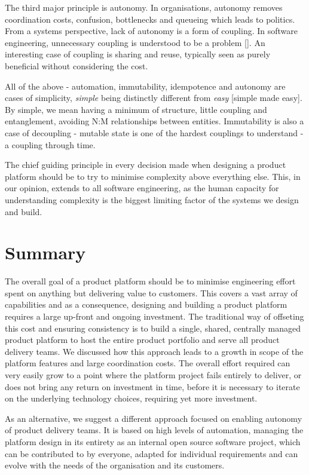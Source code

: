 \documentclass[reprint,amsmath,amssymb,aps]{revtex4-1}
\begin{document}
The third major principle is autonomy. In organisations, autonomy removes coordination costs, confusion, bottlenecks and queueing which leads to politics. From a systems perspective, lack of autonomy is a form of coupling. In software engineering, unnecessary coupling is understood to be a problem []. An interesting case of coupling is sharing and reuse, typically seen as purely beneficial without considering the cost.

All of the above - automation, immutability, idempotence and autonomy are cases of simplicity, \textit{simple} being distinctly different from \textit{easy} [simple made easy]. By simple, we mean having a minimum of structure, little coupling and entanglement, avoiding N:M relationships between entities. Immutability is also a case of decoupling - mutable state is one of the hardest couplings to understand - a coupling through time.

The chief guiding principle in every decision made when designing a product platform should be to try to minimise complexity above everything else. This, in our opinion, extends to all software engineering, as the human capacity for understanding complexity is the biggest limiting factor of the systems we design and build.

\section*{\label{sec:summary}Summary}

The overall goal of a product platform should be to minimise engineering effort spent on anything but delivering value to customers. This covers a vast array of capabilities and as a consequence, designing and building a product platform requires a large up-front and ongoing investment. The traditional way of offseting this cost and ensuring consistency is to build a single, shared, centrally managed product platform to host the entire product portfolio and serve all product delivery teams. We discussed how this approach leads to a growth in scope of the platform features and large coordination costs. The overall effort required can very easily grow to a point where the platform project fails entirely to deliver, or does not bring any return on investment in time, before it is necessary to iterate on the underlying technology choices, requiring yet more investment.

As an alternative, we suggest a different approach focused on enabling autonomy of product delivery teams. It is based on high levels of automation, managing the platform design in its entirety as an internal open source software project, which can be contributed to by everyone, adapted for individual requirements and can evolve with the needs of the organisation and its customers.
\end{document}
